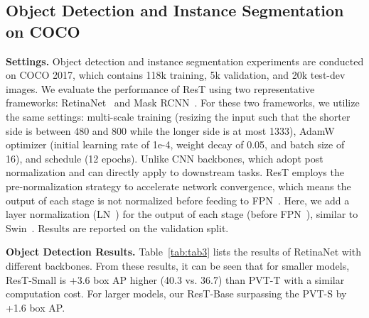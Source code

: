 \documentclass{article}
\begin{document}
\subsection{Object Detection and Instance Segmentation on COCO}
\label{sec:obj}
\textbf{Settings.} Object detection and instance segmentation experiments are conducted on COCO 2017, which contains 118k training, 5k validation, and 20k test-dev images. We evaluate the performance of ResT using two representative frameworks: RetinaNet~\cite{DBLP:conf/iccv/LinGGHD17} and Mask RCNN~\cite{DBLP:conf/iccv/HeGDG17}. For these two frameworks, we utilize the same settings: multi-scale training (resizing the input such that the shorter side is between 480 and 800 while the longer side is at most 1333), AdamW~\cite{DBLP:conf/iclr/LoshchilovH19} optimizer (initial learning rate of 1e-4, weight decay of 0.05, and batch size of 16), and  schedule (12 epochs).  Unlike CNN backbones, which adopt post normalization and can directly apply to downstream tasks. ResT employs the pre-normalization strategy to accelerate network convergence, which means the output of each stage is not normalized before feeding to FPN~\cite{DBLP:conf/cvpr/LinDGHHB17}. Here, we add a layer normalization (LN~\cite{DBLP:journals/corr/BaKH16}) for the output of each stage (before FPN~\cite{DBLP:conf/cvpr/LinDGHHB17}), similar to Swin~\cite{DBLP:journals/corr/abs-2103-14030}.
Results are reported on the validation split.

\textbf{Object Detection Results.} Table~\ref{tab:tab3} lists the results of RetinaNet with different backbones. From these results, it can be seen that for smaller models, ResT-Small is +3.6 box AP higher (40.3 vs. 36.7) than PVT-T with a similar computation cost. For larger models, our ResT-Base surpassing the PVT-S by +1.6 box AP.
\end{document}
